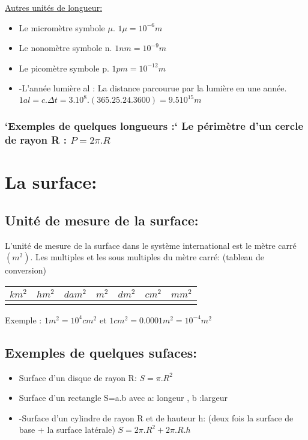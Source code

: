 \documentclass[12pt]{article}
\begin{document}
\underline{Autres unités de longueur:}

\begin{itemize}
   \item Le micromètre symbole $\mu$. $1\mu = 10^{-6} m$
   \item Le nonomètre symbole n. $1nm = 10^{-9} m$
   \item Le picomètre symbole p. $1pm = 10^{-12} m$
   \item -L’année lumière al : La distance parcourue par la lumière en une année.\\ $1al = c.\Delta{t} = 3.10^{8}.(365.25 . 24. 3600)= 9.5 10^{15}m$
\end{itemize}

\subsubsection{`Exemples de quelques longueurs :` Le périmètre d’un cercle de rayon R : $P = 2\pi.R$}

\section{La surface:}
\subsection{Unité de mesure de la surface: }
L'unité de mesure de la surface dans le système international est le mètre carré $(m^2)$.
Les multiples et les sous multiples du mètre carré: (tableau de conversion)

\begin{center}
   \begin{tabular}{ |c|c|c|c|c|c|c| }
      \hline
      $km^2$ & $hm^2$ & $dam^2$ & \bf{$m^2$} & $dm^2$ & $cm^2$ & $mm^2$ \\
      \hline
        &   &    &  &   &   & \\
\hline
\end{tabular}
\end{center}
Exemple : $1m^2 = 10^4 cm^2$ et $1cm^2 = 0.0001m^2 = 10^{-4} m^2$


\subsection{Exemples de quelques sufaces:}
\begin{itemize}
   \item Surface d’un disque de rayon R: $S = \pi.R^2$
   \item Surface d’un rectangle S=a.b avec a: longeur , b :largeur
   \item -Surface d’un cylindre de rayon R et de hauteur h: (deux fois la surface de base + la surface latérale) $S = 2\pi.R^2 + 2\pi.R.h$
\end{itemize}
\end{document}
